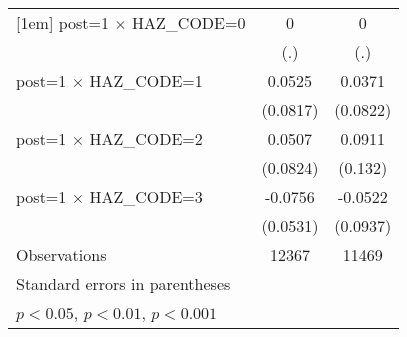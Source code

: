 {\begin{tabular}{l*{2}{c}}
[1em]
post=1 $\times$ HAZ\_CODE=0&           0         &           0         \\
                    &         (.)         &         (.)         \\
[1em]
post=1 $\times$ HAZ\_CODE=1&      0.0525         &      0.0371         \\
                    &    (0.0817)         &    (0.0822)         \\
[1em]
post=1 $\times$ HAZ\_CODE=2&      0.0507         &      0.0911         \\
                    &    (0.0824)         &     (0.132)         \\
[1em]
post=1 $\times$ HAZ\_CODE=3&     -0.0756         &     -0.0522         \\
                    &    (0.0531)         &    (0.0937)         \\
\hline
Observations        &       12367         &       11469         \\
\hline\hline
\multicolumn{3}{l}{\footnotesize Standard errors in parentheses}\\
\multicolumn{3}{l}{\footnotesize \sym{*} \(p<0.05\), \sym{**} \(p<0.01\), \sym{***} \(p<0.001\)}\\
\end{tabular}
}
